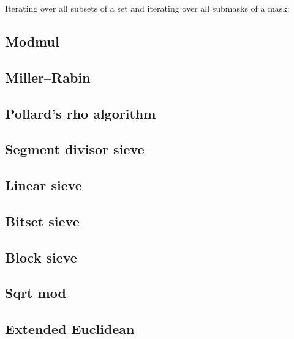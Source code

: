 Iterating over all subsets of a set and iterating over all submasks of a mask:

\subsection{Modmul}

\subsection{Miller–Rabin}

\subsection{Pollard's rho algorithm}

\subsection{Segment divisor sieve}

\subsection{Linear sieve}

\subsection{Bitset sieve}

\subsection{Block sieve}

\subsection{Sqrt mod}

\subsection{Extended Euclidean}

